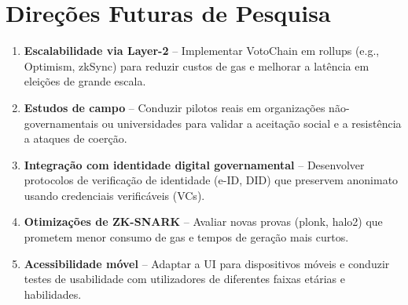 \section{Direções Futuras de Pesquisa}
\begin{enumerate}
    \item \textbf{Escalabilidade via Layer-2} – Implementar VotoChain em rollups (e.g., Optimism, zkSync) para reduzir custos de gas e melhorar a latência em eleições de grande escala.
    \item \textbf{Estudos de campo} – Conduzir pilotos reais em organizações não-governamentais ou universidades para validar a aceitação social e a resistência a ataques de coerção.
    \item \textbf{Integração com identidade digital governamental} – Desenvolver protocolos de verificação de identidade (e-ID, DID) que preservem anonimato usando credenciais verificáveis (VCs).
    \item \textbf{Otimizações de ZK-SNARK} – Avaliar novas provas (plonk, halo2) que prometem menor consumo de gas e tempos de geração mais curtos.
    \item \textbf{Acessibilidade m{\'o}vel} – Adaptar a UI para dispositivos m{\'o}veis e conduzir testes de usabilidade com utilizadores de diferentes faixas et{\'a}rias e habilidades.
\end{enumerate}


